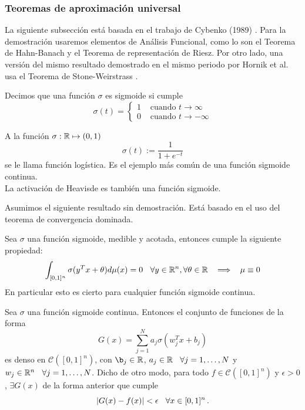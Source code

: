 \subsubsection{Teoremas de aproximación universal}
La siguiente subsección está basada en el trabajo de Cybenko (1989) \cite{cybenko}. Para la demostración usaremos elementos de Análisis Funcional, como lo son el Teorema de Hahn-Banach y el Teorema de representación de Riesz. Por otro lado, una versión del mismo resultado demostrado en el mismo periodo por Hornik et al. usa el Teorema de Stone-Weirstrass \cite{hornik}.
\begin{definition}
Decimos que una función $\sigma$ es sigmoide si cumple
$$ \sigma(t) = \begin{cases}
1 & \text{ cuando }t\to\infty \\
0 & \text{ cuando }t\to-\infty
\end{cases}$$
\end{definition}
\begin{example}
A la función $\sigma:\mathbb{R}\mapsto (0,1)$
$$ \sigma(t):= \displaystyle\frac{1}{1+e^{-t}}$$
se le llama función logística. Es el ejemplo más común de una función sigmoide continua.
\\ La activación de Heavisde es también una función sigmoide.
\end{example}
Asumimos el siguiente resultado sin demostración. Está basado en el uso del teorema de convergencia dominada.
\begin{lemma}
\label{lemma:discrim}
Sea $\sigma$ una función sigmoide, medible y acotada, entonces cumple la siguiente propiedad:
$$ \int_{[0,1]^n}\sigma(y^Tx+\theta)d\mu(x)=0\hspace{.25cm}\, \forall y\in\mathbb{R}^n,\forall\theta \in\mathbb{R}\hspace{.25cm}\, \Longrightarrow \hspace{.25cm}\,  \mu\equiv 0$$
En particular esto es cierto para cualquier función sigmoide continua.
\end{lemma}
\begin{theorem}
\label{teo:AU}
Sea $\sigma$ una función sigmoide continua. Entonces el conjunto de funciones de la forma
$$ G(x) = \displaystyle \sum^N_{j=1}a_j\sigma(w^T_jx+b_j)$$
es denso en $\mathcal{C}([0,1]^n)$, con $\b_j\in\R$, $a_j\in\mathbb{R}\hspace{.25cm}\, \forall j=1,\dots,N$ y $w_j\in\mathbb{R}^n\hspace{.25cm}\,\forall j=1,\dots,N$. Dicho de otro modo, para todo $f\in\mathcal{C}([0,1]^n)$ y $\epsilon>0$, $\exists G(x)$ de la forma anterior que cumple
$$ |G(x)-f(x)|<\epsilon\hspace{.25cm}\,\forall x\in [0,1]^n\,.$$
\end{theorem}
